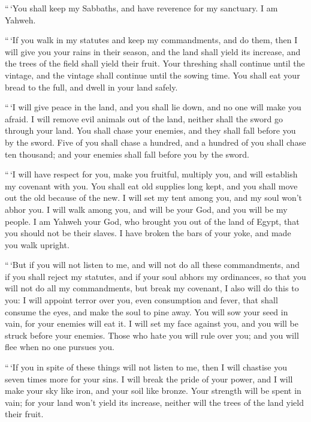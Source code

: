  ``\,`You shall keep my Sabbaths, and have reverence for my
sanctuary. I am Yahweh.

 ``\,`If you walk in my statutes and keep my commandments,
and do them,  then I will give you your rains in their
season, and the land shall yield its increase, and the trees of the
field shall yield their fruit.  Your threshing shall
continue until the vintage, and the vintage shall continue until the
sowing time. You shall eat your bread to the full, and dwell in your
land safely.

 ``\,`I will give peace in the land, and you shall lie down,
and no one will make you afraid. I will remove evil animals out of the
land, neither shall the sword go through your land.  You
shall chase your enemies, and they shall fall before you by the sword.
 Five of you shall chase a hundred, and a hundred of you
shall chase ten thousand; and your enemies shall fall before you by the
sword.

 ``\,`I will have respect for you, make you fruitful,
multiply you, and will establish my covenant with you.  You
shall eat old supplies long kept, and you shall move out the old because
of the new.  I will set my tent among you, and my soul
won't abhor you.  I will walk among you, and will be your
God, and you will be my people.  I am Yahweh your God, who
brought you out of the land of Egypt, that you should not be their
slaves. I have broken the bars of your yoke, and made you walk upright.

 ``\,`But if you will not listen to me, and will not do all
these commandments,  and if you shall reject my statutes,
and if your soul abhors my ordinances, so that you will not do all my
commandments, but break my covenant,  I also will do this
to you: I will appoint terror over you, even consumption and fever, that
shall consume the eyes, and make the soul to pine away. You will sow
your seed in vain, for your enemies will eat it.  I will
set my face against you, and you will be struck before your enemies.
Those who hate you will rule over you; and you will flee when no one
pursues you.

 ``\,`If you in spite of these things will not listen to
me, then I will chastise you seven times more for your sins.
 I will break the pride of your power, and I will make your
sky like iron, and your soil like bronze.  Your strength
will be spent in vain; for your land won't yield its increase, neither
will the trees of the land yield their fruit.

